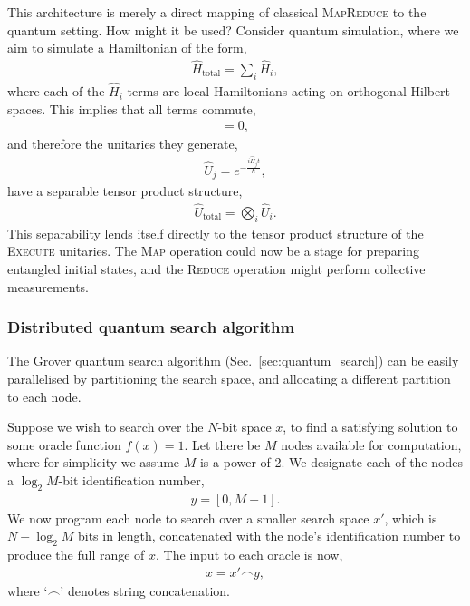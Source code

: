 This architecture is merely a direct mapping of classical \textsc{MapReduce} to the quantum setting. How might it be used? Consider quantum simulation, where we aim to simulate a Hamiltonian of the form,
\begin{align}
\hat{H}_\mathrm{total} = \sum_i \hat{H}_i,	
\end{align}
where each of the $\hat{H}_i$ terms are local Hamiltonians acting on orthogonal Hilbert spaces. This implies that all terms commute,
\begin{align}
[\hat{H}_i,\hat{H}_j]=0,
\end{align}
and therefore the unitaries they generate,
\begin{align}
	\hat{U}_j=e^{-\frac{i\hat{H}_jt}{\hbar}},
\end{align}
have a separable tensor product structure,
\begin{align}
	\hat{U}_\mathrm{total}=\bigotimes_i \hat{U}_i.
\end{align}
This separability lends itself directly to the tensor product structure of the \textsc{Execute} unitaries. The \textsc{Map} operation could now be a stage for preparing entangled initial states, and the \textsc{Reduce} operation might perform collective measurements.


\subsubsection{Distributed quantum search algorithm}

The Grover quantum search algorithm (Sec.~\ref{sec:quantum_search}) can be easily parallelised by partitioning the search space, and allocating a different partition to each node.

Suppose we wish to search over the $N$-bit space $x$, to find a satisfying solution to some oracle function \mbox{$f(x)=1$}. Let there be $M$ nodes available for computation, where for simplicity we assume $M$ is a power of 2. We designate each of the nodes a $\log_2 M$-bit identification number,
\begin{align}
	y=[0,M-1].
\end{align}
We now program each node to search over a smaller search space $x'$, which is \mbox{$N-\log_2 M$} bits in length, concatenated with the node's identification number to produce the full range of $x$. The input to each oracle is now,
\begin{align}
x = x'\frown y,
\end{align}
where `$\frown$' denotes string concatenation.

